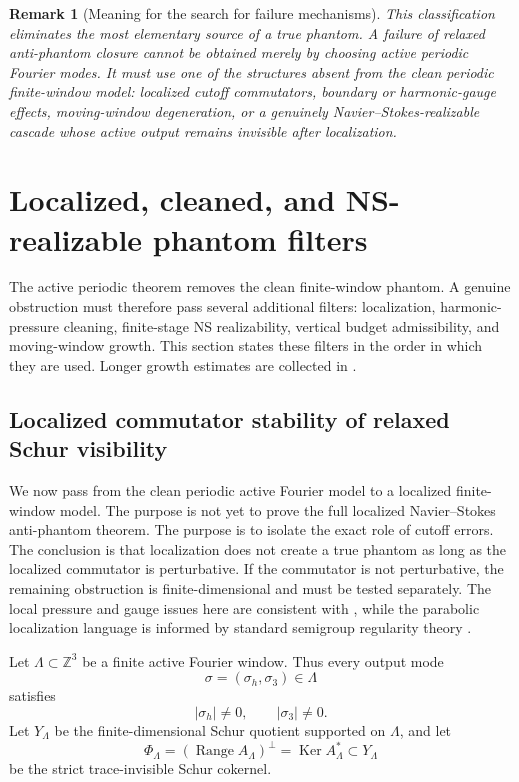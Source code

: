 \documentclass[11pt]{article}
\numberwithin{equation}{section}
\newtheorem{remark}[theorem]{Remark}
\DeclareMathOperator{\Range}{Range}
\DeclareMathOperator{\Ker}{Ker}
\begin{document}
\begin{remark}[Meaning for the search for failure mechanisms]\label{rem:failure-search-finite-window}
This classification eliminates the most elementary source of a true phantom.  A failure of relaxed anti-phantom closure cannot be obtained merely by choosing active periodic Fourier modes.  It must use one of the structures absent from the clean periodic finite-window model: localized cutoff commutators, boundary or harmonic-gauge effects, moving-window degeneration, or a genuinely Navier--Stokes-realizable cascade whose active output remains invisible after localization.
\end{remark}


\section{Localized, cleaned, and NS-realizable phantom filters}

The active periodic theorem removes the clean finite-window phantom. A genuine obstruction must therefore pass several additional filters: localization, harmonic-pressure cleaning, finite-stage NS realizability, vertical budget admissibility, and moving-window growth. This section states these filters in the order in which they are used. Longer growth estimates are collected in .

\subsection{Localized commutator stability of relaxed Schur visibility}\label{subsec:localized-commutator-stability}

We now pass from the clean periodic active Fourier model to a localized finite-window model.  The purpose is not yet to prove the full localized Navier--Stokes anti-phantom theorem.  The purpose is to isolate the exact role of cutoff errors.  The conclusion is that localization does not create a true phantom as long as the localized commutator is perturbative.  If the commutator is not perturbative, the remaining obstruction is finite-dimensional and must be tested separately.  The local pressure and gauge issues here are consistent with \cite{SohrWahl1986,Wolf2017,Seregin2015}, while the parabolic localization language is informed by standard semigroup regularity theory \cite{Amann1995,Lunardi1995}.

Let \(\Lambda\subset\mathbb Z^3\) be a finite active Fourier window.  Thus every output mode
\[
        \sigma=(\sigma_h,\sigma_3)\in\Lambda
\]
satisfies
\[
        |\sigma_h|\neq0,
        \qquad
        |\sigma_3|\neq0.
\]
Let \(Y_\Lambda\) be the finite-dimensional Schur quotient supported on \(\Lambda\), and let
\[
        \Phi_\Lambda=(\Range A_\Lambda)^\perp=\Ker A_\Lambda^*
        \subset Y_\Lambda
\]
be the strict trace-invisible Schur cokernel.
\end{document}
